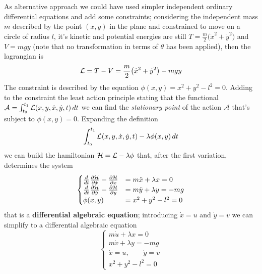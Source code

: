 	As alternative approach we could have used simpler independent ordinary differential equations and add some constraints; considering the independent mass $m$  described by the point $(x,y)$ in the plane and constrained to move on a circle of radius $l$, it's kinetic and potential energies are still $T = \frac m2 \big(\dot x^2 + \dot y^2\big)$ and $V = mgy$ (note that no transformation in terms of $\theta$ has been applied), then the lagrangian is
	\[ \mathcal L = T-V = \frac m 2 \big(\dot x^2 + \dot y^2\big) - mgy \]
	The constraint is described by the equation $\phi(x,y) = x^2 + y^2 - l^2 = 0$. Adding to the constraint the least action principle stating that the functional $\mathcal A = \int_{t_0}^{t_1} \mathcal L (x,y,\dot x,\dot y,t)\, dt$ we can find the \textit{stationary point} of the action $\mathcal A$ that's subject to $\phi(x,y) = 0$. Expanding the definition
	\[ \int_{t_0}^{t_1} \mathcal L (x,y,\dot x,\dot y,t) - \lambda \phi(x,y)\, dt  \]
	we can build the hamiltonian $\mathcal{H} = \mathcal L - \lambda \phi$ that, after the first variation, determines the system
	\[ \begin{cases}
		\frac d{dt} \frac{\partial \mathcal{H}}{\partial \dot x} - \frac{\partial \mathcal{H}}{\partial x} & = m\ddot x + \lambda x = 0 \\
		\frac d{dt} \frac{\partial \mathcal{H}}{\partial \dot y} - \frac{\partial \mathcal{H}}{\partial y} & = m\ddot y + \lambda y = -mg \\
		\phi(x,y) & = x^2 + y^2 - l^2= 0
	\end{cases} \]
	that is a \textbf{differential algebraic equation}; introducing $\dot x = u$ and $\dot y = v$ we can simplify to a differential algebraic equation
	\begin{equation} \label{eq:dae:daesys}
		\begin{cases}
			m \dot u + \lambda x = 0 \\
			m \dot v + \lambda y = -mg \\
			\dot x= u, \qquad \dot y = v\\
			x^2 + y^2 - l^2= 0
		\end{cases} 
	\end{equation}
	
